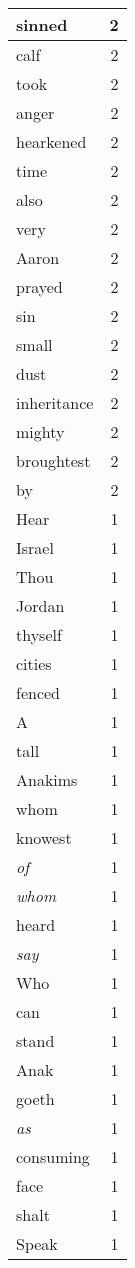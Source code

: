 \begin{center}
\begin{longtable}{l|r}
sinned & 2 \\ \hline
calf & 2 \\ \hline
took & 2 \\ \hline
anger & 2 \\ \hline
hearkened & 2 \\ \hline
time & 2 \\ \hline
also & 2 \\ \hline
very & 2 \\ \hline
Aaron & 2 \\ \hline
prayed & 2 \\ \hline
sin & 2 \\ \hline
small & 2 \\ \hline
dust & 2 \\ \hline
inheritance & 2 \\ \hline
mighty & 2 \\ \hline
broughtest & 2 \\ \hline
by & 2 \\ \hline
Hear & 1 \\ \hline
Israel & 1 \\ \hline
Thou & 1 \\ \hline
Jordan & 1 \\ \hline
thyself & 1 \\ \hline
cities & 1 \\ \hline
fenced & 1 \\ \hline
A & 1 \\ \hline
tall & 1 \\ \hline
Anakims & 1 \\ \hline
whom & 1 \\ \hline
knowest & 1 \\ \hline
\emph{of} & 1 \\ \hline
\emph{whom} & 1 \\ \hline
heard & 1 \\ \hline
\emph{say} & 1 \\ \hline
Who & 1 \\ \hline
can & 1 \\ \hline
stand & 1 \\ \hline
Anak & 1 \\ \hline
goeth & 1 \\ \hline
\emph{as} & 1 \\ \hline
consuming & 1 \\ \hline
face & 1 \\ \hline
shalt & 1 \\ \hline
Speak & 1 \\ \hline

\end{longtable}
\end{center}
